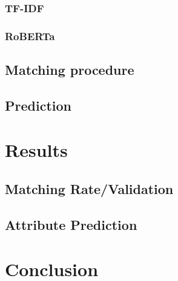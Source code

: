 \documentclass[11pt]{article}
\begin{document}
    \subsubsection{TF-IDF}
    \subsubsection{RoBERTa}

  \subsection{Matching procedure}

  \subsection{Prediction}

\section{Results}
  \subsection{Matching Rate/Validation}
  \subsection{Attribute Prediction}

\section{Conclusion}
\end{document}
